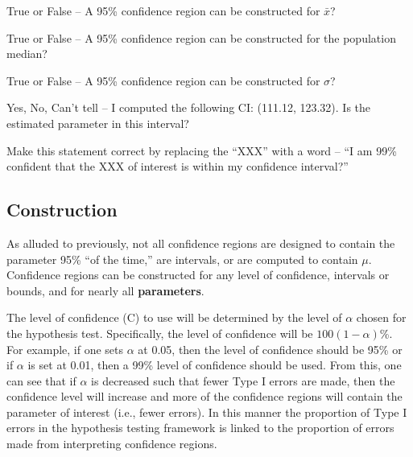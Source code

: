 \documentclass[10pt,openany]{book}\usepackage[]{graphicx}\usepackage[]{color}
\begin{document}
\vspace{-12pt}

\vspace{-12pt}

\begin{exsection}
  \item \label{revex:CIstat1TF} True or False -- A 95\% confidence region can be constructed for $\bar{x}$? 
  \item \label{revex:CIparam1TF} True or False -- A 95\% confidence region can be constructed for the population median? 
  \item \label{revex:CIparam2TF} True or False -- A 95\% confidence region can be constructed for $\sigma$? 
  \item \label{revex:CIparam3YNC} Yes, No, Can't tell -- I computed the following CI: (111.12, 123.32). Is the estimated parameter in this interval? 
  \item \label{revex:CIparam4C} Make this statement correct by replacing the ``XXX'' with a word -- ``I am 99\% confident that the XXX of interest is within my confidence interval?'' 
\end{exsection}


\subsection{Construction} \label{sec:CIConstruct}
As alluded to previously, not all confidence regions are designed to contain the parameter 95\% ``of the time,'' are intervals, or are computed to contain $\mu$.  Confidence regions can be constructed for any level of confidence, intervals or bounds, and for nearly all \textbf{parameters}.

The level of confidence (C) to use will be determined by the level of $\alpha$ chosen for the hypothesis test.  Specifically, the level of confidence will be $100(1-\alpha)$\%.  For example, if one sets $\alpha$ at 0.05, then the level of confidence should be 95\% or if $\alpha$ is set at 0.01, then a 99\% level of confidence should be used.  From this, one can see that if $\alpha$ is decreased such that fewer Type I errors are made, then the confidence level will increase and more of the confidence regions will contain the parameter of interest (i.e., fewer errors).  In this manner the proportion of Type I errors in the hypothesis testing framework is linked to the proportion of errors made from interpreting confidence regions.
\end{document}
